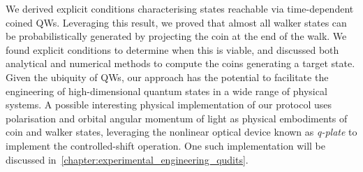 We derived explicit conditions characterising states reachable via time-dependent coined \acp{QW}.
Leveraging this result, we proved that almost all walker states can be probabilistically generated by projecting the coin at the end of the walk.
We found explicit conditions to determine when this is viable, and discussed both analytical and numerical methods to compute the coins generating a target state.
Given the ubiquity of \acp{QW}, our approach has the potential to facilitate the engineering of high-dimensional quantum states in a wide range of physical systems.
A possible interesting physical implementation of our protocol uses polarisation and orbital angular momentum of light as physical embodiments of coin and walker states, leveraging the nonlinear optical device known as \emph{q-plate} to implement the controlled-shift operation.
One such implementation will be discussed in~\cref{chapter:experimental_engineering_qudits}.




